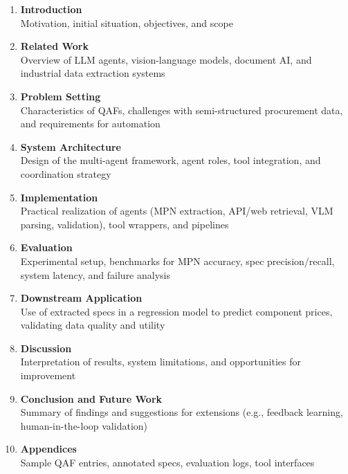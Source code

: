 \documentclass[11pt]{article}
\begin{document}
\begin{enumerate}
  \item \textbf{Introduction} \\
  Motivation, initial situation, objectives, and scope

  \item \textbf{Related Work} \\
  Overview of LLM agents, vision-language models, document AI, and industrial data extraction systems

  \item \textbf{Problem Setting} \\
  Characteristics of QAFs, challenges with semi-structured procurement data, and requirements for automation

  \item \textbf{System Architecture} \\
  Design of the multi-agent framework, agent roles, tool integration, and coordination strategy

  \item \textbf{Implementation} \\
  Practical realization of agents (MPN extraction, API/web retrieval, VLM parsing, validation), tool wrappers, and pipelines

  \item \textbf{Evaluation} \\
  Experimental setup, benchmarks for MPN accuracy, spec precision/recall, system latency, and failure analysis

  \item \textbf{Downstream Application} \\
  Use of extracted specs in a regression model to predict component prices, validating data quality and utility

  \item \textbf{Discussion} \\
  Interpretation of results, system limitations, and opportunities for improvement

  \item \textbf{Conclusion and Future Work} \\
  Summary of findings and suggestions for extensions (e.g., feedback learning, human-in-the-loop validation)

  \item \textbf{Appendices} \\
  Sample QAF entries, annotated specs, evaluation logs, tool interfaces
\end{enumerate}
\end{document}
